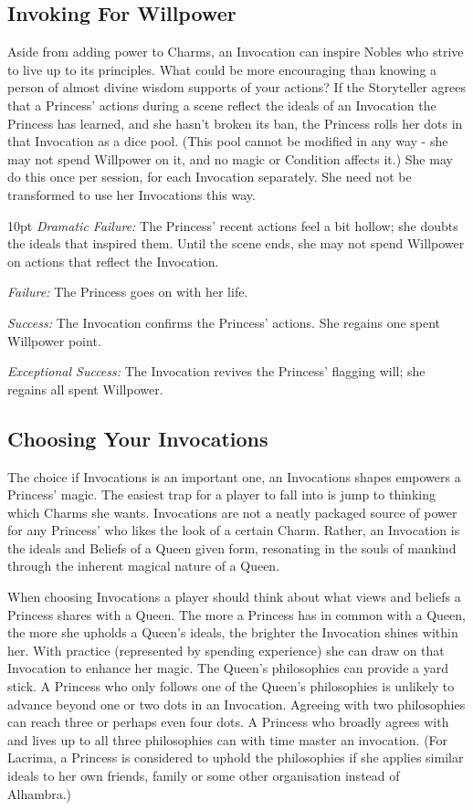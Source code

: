 \subsection*{Invoking For Willpower}

Aside from adding power to Charms, an Invocation can inspire Nobles who strive to live up to its principles. What could be more encouraging than knowing a person of almost divine wisdom supports of your actions? If the Storyteller agrees that a Princess’ actions during a scene reflect the ideals of an Invocation the Princess has learned, and she hasn’t broken its ban, the Princess rolls her dots in that Invocation as a dice pool. (This pool cannot be modified in any way - she may not spend Willpower on it, and no magic or Condition affects it.) She may do this once per session, for each Invocation separately. She need not be transformed to use her Invocations this way.
 
 \begin{myindentpar}{10pt}
    \emph{Dramatic Failure:}  The Princess’ recent actions feel a bit hollow; she doubts the ideals that inspired them. Until the scene ends, she may not spend Willpower on actions that reflect the Invocation.

    \emph{Failure:} The Princess goes on with her life.

    \emph{Success:} The Invocation confirms the Princess’ actions. She regains one spent Willpower point.

    \emph{Exceptional Success:} The Invocation revives the Princess’ flagging will; she regains all spent Willpower.
\end{myindentpar}

\subsection*{Choosing Your Invocations}

The choice if Invocations is an important one, an Invocations shapes empowers a Princess' magic. The easiest trap for a player to fall into is jump to thinking which Charms she wants. Invocations are not a neatly packaged source of power for any Princess' who likes the look of a certain Charm. Rather, an Invocation is the ideals and Beliefs of a Queen given form, resonating in the souls of mankind through the inherent magical nature of a Queen.

When choosing Invocations a player should think about what views and beliefs a Princess shares with a Queen. The more a Princess has in common with a Queen, the more she upholds a Queen's ideals, the brighter the Invocation shines within her. With practice (represented by spending experience) she can draw on that Invocation to enhance her magic. The Queen's philosophies can provide a yard stick. A Princess who only follows one of the Queen's philosophies is unlikely to advance beyond one or two dots in an Invocation. Agreeing with two philosophies can reach three or perhaps even four dots. A Princess who broadly agrees with and lives up to all three philosophies can with time master an invocation. (For Lacrima, a Princess is considered to uphold the philosophies if she applies similar ideals to her own friends, family or some other organisation instead of Alhambra.)

